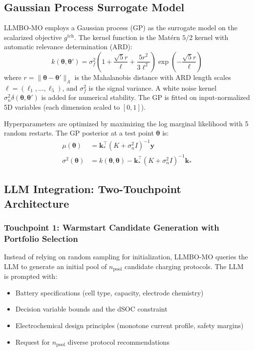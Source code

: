 \documentclass[journal]{IEEEtran}
\newcommand{\btheta}{\boldsymbol{\theta}}
\begin{document}
\subsection{Gaussian Process Surrogate Model}

LLMBO-MO employs a Gaussian process (GP) as the surrogate model on the scalarized objective $g^{\text{tch}}$. The kernel function is the Mat\'{e}rn $5/2$ kernel with automatic relevance determination (ARD):
\begin{equation}
k(\btheta, \btheta') = \sigma_f^2 \left(1 + \frac{\sqrt{5}r}{\ell} + \frac{5r^2}{3\ell^2}\right) \exp\left(-\frac{\sqrt{5}r}{\ell}\right)
\label{eq:matern}
\end{equation}
where $r = \|\btheta - \btheta'\|_\Lambda$ is the Mahalanobis distance with ARD length scales $\ell = (\ell_1, \ldots, \ell_5)$, and $\sigma_f^2$ is the signal variance. A white noise kernel $\sigma_n^2 \delta(\btheta, \btheta')$ is added for numerical stability. The GP is fitted on input-normalized 5D variables (each dimension scaled to $[0,1]$).

Hyperparameters are optimized by maximizing the log marginal likelihood with 5 random restarts. The GP posterior at a test point $\btheta$ is:
\begin{align}
\mu(\btheta) &= \mathbf{k}_*^\top (K + \sigma_n^2 I)^{-1} \mathbf{y} \label{eq:gp_mean}\\
\sigma^2(\btheta) &= k(\btheta, \btheta) - \mathbf{k}_*^\top (K + \sigma_n^2 I)^{-1} \mathbf{k}_* \label{eq:gp_var}
\end{align}

\subsection{LLM Integration: Two-Touchpoint Architecture}

\subsubsection{Touchpoint 1: Warmstart Candidate Generation with Portfolio Selection}
\label{sec:warmstart}

Instead of relying on random sampling for initialization, LLMBO-MO queries the LLM to generate an initial pool of $n_{\text{pool}}$ candidate charging protocols. The LLM is prompted with:
\begin{itemize}
\item Battery specifications (cell type, capacity, electrode chemistry)
\item Decision variable bounds and the dSOC constraint
\item Electrochemical design principles (monotone current profile, safety margins)
\item Request for $n_{\text{pool}}$ diverse protocol recommendations
\end{itemize}
\end{document}
